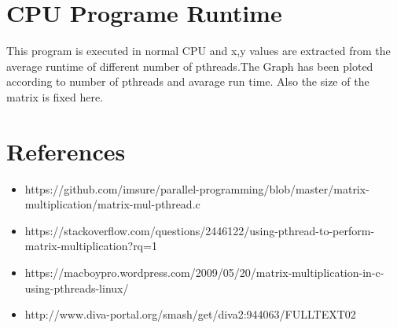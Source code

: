 \documentclass[12pt,oneside,a4paper]{article}
\title{\titlefont{Matrix Multiplication Runtime Using Pthreads}}
\author{S.P.S Deemantha (CST140007)}
\begin{document}
	\maketitle


	\newpage

	\tableofcontents

	\newpage

	\section{CPU Programe Runtime}

	\par
	This program is executed in normal CPU and x,y values are extracted from the average runtime of different number of pthreads.The Graph has been ploted according to number of pthreads and avarage run time. Also the size of the matrix is fixed here.
	\hfill \break
      
     \vspace{5mm} 
                
    \vspace{2cm} 
     

	
	\newpage

	\section{References}

	\begin{itemize}
	  \item https://github.com/imsure/parallel-programming/blob/master/matrix-multiplication/matrix-mul-pthread.c
	  \item https://stackoverflow.com/questions/2446122/using-pthread-to-perform-matrix-multiplication?rq=1
      \item https://macboypro.wordpress.com/2009/05/20/matrix-multiplication-in-c-using-pthreads-linux/
      \item http://www.diva-portal.org/smash/get/diva2:944063/FULLTEXT02
	\end{itemize}
\end{document}

